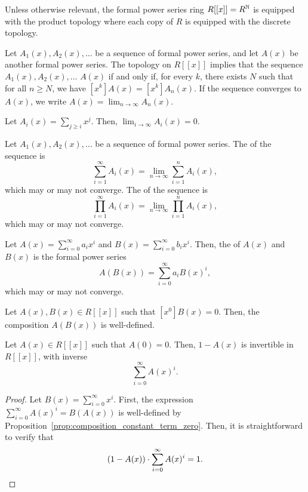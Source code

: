 Unless otherwise relevant, the formal power series ring \(R[[x]] = R^{\mathbb{N}}\) is equipped with the product topology where each copy of \(R\) is equipped with the discrete topology.

Let \(A_1(x), A_2(x), \dots\) be a sequence of formal power series,
and let \(A(x)\) be another formal power series.
The topology on \(R[[x]]\) implies that
the sequence \(A_1(x), A_2(x), \dots\)  \(A(x)\)
if and only if,
for every \(k\),
there exists \(N\) such that
for all \(n \geq N\),
we have \([x^k] A(x) = [x^k] A_n(x)\).
If the sequence converges to \(A(x)\),
we write \(A(x) = \lim_{n \to \infty} A_n(x)\).

\begin{example}
    Let \(A_i(x) = \sum_{j \geq i} x^j\).
    Then, \(\lim_{i \to \infty} A_i(x) = 0\).
\end{example}

Let \(A_1(x), A_2(x), \dots\) be a sequence of formal power series.
The  of the sequence is
\[
    \sum_{i=1}^\infty A_i(x) = \lim_{n \to \infty} \sum_{i=1}^n A_i(x),
\]
which may or may not converge.
The  of the sequence is
\[
    \prod_{i=1}^\infty A_i(x) = \lim_{n \to \infty} \prod_{i=1}^n A_i(x),
\]
which may or may not converge.

Let \(A(x) = \sum_{i=0}^\infty a_i x^i\) and \(B(x) = \sum_{i=0}^\infty b_i x^i\).
Then, the  of \(A(x)\) and \(B(x)\) is the formal power series
\[
    A(B(x)) = \sum_{i=0}^\infty a_i B(x)^i,
\]
which may or may not converge.

\begin{proposition} \label{prop:composition_constant_term_zero}
    Let \(A(x), B(x) \in R[[x]]\) such that \([x^0] B(x) = 0\).
    Then, the composition \(A(B(x))\) is well-defined.
\end{proposition}

\begin{proposition}
    Let \(A(x) \in R[[x]]\) such that \(A(0) = 0\).
    Then, \(1 - A(x)\) is invertible in \(R[[x]]\), with inverse
    \[
        \sum_{i=0}^\infty A(x)^i.
    \]
\end{proposition}

\begin{proof}
    Let \(B(x) = \sum_{i=0}^\infty x^i\).
    First, the expression \(\sum_{i=0}^\infty A(x)^i = B(A(x))\) is well-defined by Proposition~\ref{prop:composition_constant_term_zero}.
    Then, it is straightforward to verify that
    \[
        (1 - A(x)) \cdot \sum_{i=0}^\infty A(x)^i = 1. \qedhere
    \]
\end{proof}